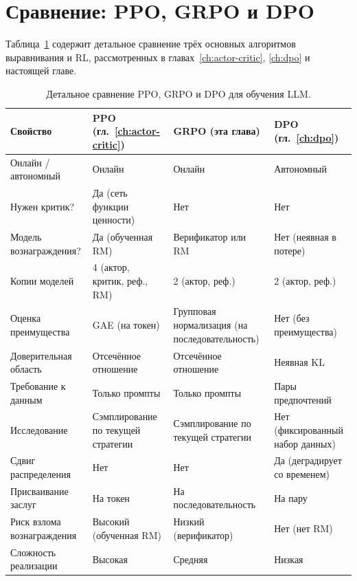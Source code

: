 \section{Сравнение: PPO, GRPO и DPO}
\label{sec:grpo-comparison}

Таблица~\ref{tab:ppo-grpo-dpo} содержит детальное сравнение трёх основных алгоритмов выравнивания и RL, рассмотренных в главах~\ref{ch:actor-critic}, \ref{ch:dpo} и настоящей главе.

\begin{table}[ht]
\centering
\caption{Детальное сравнение PPO, GRPO и DPO для обучения LLM.}
\label{tab:ppo-grpo-dpo}
\footnotesize
\begin{tabular}{@{}lp{3.2cm}p{3.2cm}p{3.2cm}@{}}
\toprule
\textbf{Свойство} & \textbf{PPO} (гл.~\ref{ch:actor-critic}) & \textbf{GRPO} (эта глава) & \textbf{DPO} (гл.~\ref{ch:dpo}) \\
\midrule
Онлайн / автономный & Онлайн & Онлайн & Автономный \\
Нужен критик? & Да (сеть функции ценности) & Нет & Нет \\
Модель вознаграждения? & Да (обученная RM) & Верификатор или RM & Нет (неявная в потере) \\
Копии моделей & 4 (актор, критик, реф., RM) & 2 (актор, реф.) & 2 (актор, реф.) \\
Оценка преимущества & GAE (на токен) & Групповая нормализация (на последовательность) & Нет (без преимущества) \\
Доверительная область & Отсечённое отношение & Отсечённое отношение & Неявная KL \\
Требование к данным & Только промпты & Только промпты & Пары предпочтений \\
Исследование & Сэмплирование по текущей стратегии & Сэмплирование по текущей стратегии & Нет (фиксированный набор данных) \\
Сдвиг распределения & Нет & Нет & Да (деградирует со временем) \\
Присваивание заслуг & На токен & На последовательность & На пару \\
Риск взлома вознаграждения & Высокий (обученная RM) & Низкий (верификатор) & Нет (нет RM) \\
Сложность реализации & Высокая & Средняя & Низкая \\
\bottomrule
\end{tabular}
\end{table}

